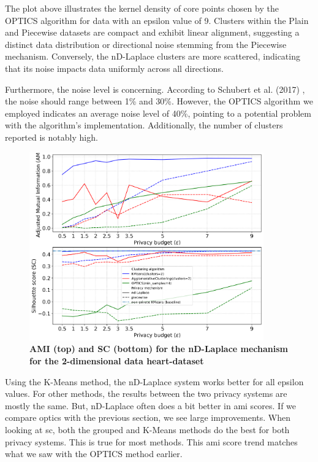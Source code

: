 The plot above illustrates the kernel density of core points chosen by the OPTICS algorithm for data with an epsilon value of 9. Clusters within the Plain and Piecewise datasets are compact and exhibit linear alignment, suggesting a distinct data distribution or directional noise stemming from the Piecewise mechanism. Conversely, the nD-Laplace clusters are more scattered, indicating that its noise impacts data uniformly across all directions.

Furthermore, the noise level is concerning. According to Schubert et al. (2017) \citep{schubert_dbscan_2017}, the noise should range between 1\% and 30\%. However, the OPTICS algorithm we employed indicates an average noise level of 40\%, pointing to a potential problem with the algorithm's implementation. Additionally, the number of clusters reported is notably high.


\newpage
\begin{figure}[H]
  \centering
  \caption{\textbf{AMI (top) and SC (bottom) for the nD-Laplace mechanism for the 2-dimensional data heart-dataset}}
  \includegraphics[width=0.9\textwidth]{Results/nd-laplace/nd-Laplace/heart-dataset/ami-and-sc_2_dimensions.png}

  \label{fig:validation-heart-dataset_comparison_2d-laplace}
\end{figure}
Using the K-Means method, the nD-Laplace system works better for all epsilon values. For other methods, the results between the two privacy systems are mostly the same. But, nD-Laplace often does a bit better in \gls{ami} scores. If we compare \gls{optics} with the previous section, we see large improvements. 
When looking at \gls{sc}, both the grouped and K-Means methods do the best for both privacy systems. This is true for most methods. This \gls{ami} score trend matches what we saw with the OPTICS method earlier.

